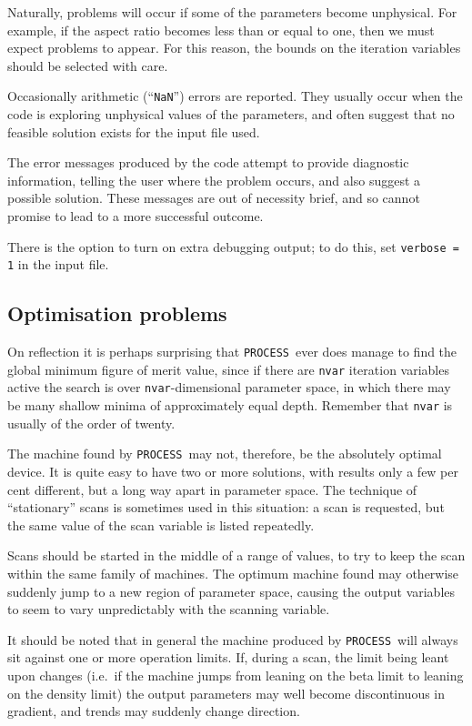 \documentclass[11pt,a4paper]{report}
\newcommand{\process}{\mbox{\texttt{PROCESS}}}
\begin{document}
Naturally, problems will occur if some of the parameters become unphysical.
For example, if the aspect ratio becomes less than or equal to one, then we
must expect problems to appear. For this reason, the bounds on the
iteration variables should be selected with care.

Occasionally arithmetic (``\texttt{NaN}'') errors are reported. They usually occur when the code is exploring unphysical values of the parameters, and often suggest that no feasible solution exists for the input file used.

The error messages produced by the code attempt to provide diagnostic
information, telling the user where the problem occurs, and also suggest a
possible solution. These messages are out of necessity brief, and so cannot
promise to lead to a more successful outcome.

There is the option to turn on extra debugging output; to do this, set \texttt{verbose = 1} in the input file.

\subsection{Optimisation problems}

On reflection it is perhaps surprising that \process\ ever does manage to
find the global minimum figure of merit value, since if there are
\texttt{nvar} iteration variables active the search is over
\texttt{nvar}-dimensional parameter space, in which there may be many shallow
minima of approximately equal depth. Remember that \texttt{nvar} is usually of
the order of twenty.

The machine found by \process\ may not, therefore, be the absolutely optimal
device. It is quite easy to have two or more solutions, with results only a
few per cent different, but a long way apart in parameter space. The technique
of ``stationary'' scans is sometimes used in this situation: a scan is requested, but the same value of the scan variable is listed repeatedly.

Scans should be started in the middle of a range of values, to try to keep the
scan within the same family of machines. The optimum machine found may
otherwise suddenly jump to a new region of parameter space, causing the output
variables to seem to vary unpredictably with the scanning variable.

It should be noted that in general the machine produced by \process\ will
always sit against one or more operation limits. If, during a scan, the limit
being leant upon changes (i.e.\ if the machine jumps from leaning on the beta
limit to leaning on the density limit) the output parameters may well become
discontinuous in gradient, and trends may suddenly change direction.
\end{document}
